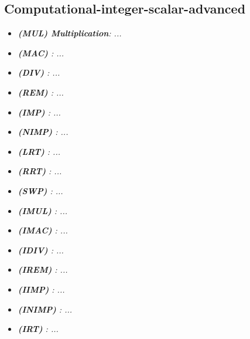     \subsection{Computational-integer-scalar-advanced}

        \begin{multicols}{2}

            \begin{itemize}

                \item \textit{\textbf{(MUL) Multiplication}: ...}

                \item \textit{\textbf{(MAC) }: ...}

                \item \textit{\textbf{(DIV) }: ...}
                
                \item \textit{\textbf{(REM) }: ...}

                \item \textit{\textbf{(IMP) }: ...}

                \item \textit{\textbf{(NIMP) }: ...}

                \item \textit{\textbf{(LRT) }: ...}
                
                \item \textit{\textbf{(RRT) }: ...}

                \item \textit{\textbf{(SWP) }: ...}

                \item \textit{\textbf{(IMUL) }: ...}

                \item \textit{\textbf{(IMAC) }: ...}
                
                \item \textit{\textbf{(IDIV) }: ...}

                \item \textit{\textbf{(IREM) }: ...}

                \item \textit{\textbf{(IIMP) }: ...}

                \item \textit{\textbf{(INIMP) }: ...}
                
                \item \textit{\textbf{(IRT) }: ...}


\end{itemize}
\end{multicols}
